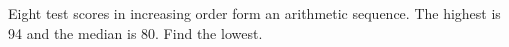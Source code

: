 Eight test scores in increasing order form an arithmetic sequence. The highest is 94 and the median is 80. Find the lowest.
